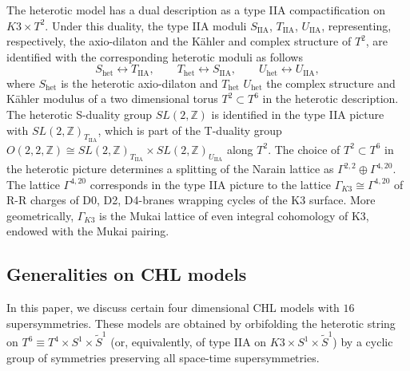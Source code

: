 \documentclass[a4paper,11pt]{article}
\newcommand{\ZZ}{\mathbb{Z}}
\numberwithin{equation}{section}
\def\be{\begin{equation}}
\def\ee{\end{equation}}
\begin{document}
The heterotic model has a dual description as a type IIA compactification on $K3\times T^2$. Under this duality, the type IIA moduli $S_{\text{IIA}}$, $T_{\text{IIA}}$, $U_{\text{IIA}}$, representing, respectively, the axio-dilaton  and the K\"ahler and complex structure of $T^2$, are identified with the corresponding heterotic moduli as follows
\be S_{\text{het}}\leftrightarrow T_{\text{IIA}},\qquad T_{\text{het}}\leftrightarrow S_{\text{IIA}},\qquad U_{\text{het}}\leftrightarrow U_{\text{IIA}},
\ee
where $S_{\text{het}}$ is the heterotic axio-dilaton   and   $T_{\text{het}}$ $U_{\text{het}}$ the complex structure and K\"ahler modulus of a two dimensional torus $T^2\subset T^6$ in the heterotic description. The heterotic S-duality group $SL(2,\ZZ)$ is identified in the type IIA picture with $SL(2,\ZZ)_{T_{\text{IIA}}}$, which is part of the T-duality group $O(2,2,\ZZ)\cong SL(2,\ZZ)_{T_{\text{IIA}}}\times SL(2,\ZZ)_{U_{\text{IIA}}}$ along $T^2$.  The choice of $T^2\subset T^6$ in the heterotic picture determines a splitting of the Narain lattice as $\Gamma^{2,2}\oplus \Gamma^{4,20}$.
The lattice $\Gamma^{4,20}$ corresponds in the type IIA picture to the lattice $\Gamma_{K3}\cong \Gamma^{4,20}$ of R-R charges of D0, D2, D4-branes wrapping cycles of the K3 surface. More geometrically, $\Gamma_{K3}$ is the Mukai lattice of even integral cohomology of K3, endowed with the Mukai pairing.

\bigskip

\subsection{Generalities on CHL models}\label{s:CHLgeneral}


In this paper, we discuss certain four dimensional CHL models with $16$ supersymmetries. These models are obtained by orbifolding the heterotic string on $T^6\equiv T^4\times S^1\times \tilde S^1$ (or, equivalently, of type IIA on $K3\times S^1\times \tilde S^1$) by a cyclic group of symmetries preserving all space-time supersymmetries. 
\end{document}
